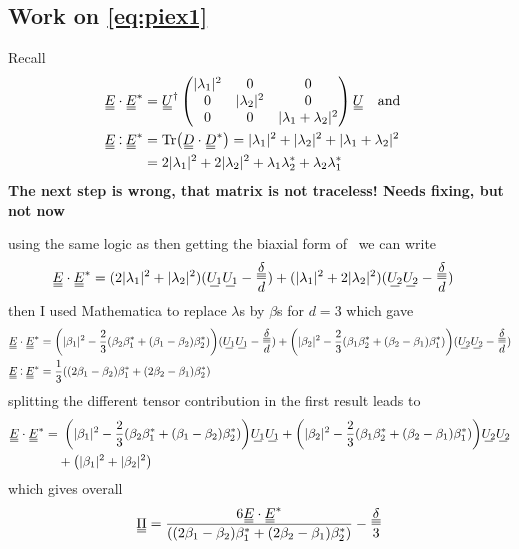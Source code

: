 \documentclass[11pt]{article}
\begin{document}
\subsection{Work on \cref{eq:piex1}}
Recall
\begin{align}
    \du{E} \cdot \du{E}^* &= \du{U}^\dagger \begin{pmatrix} |\lambda_1|^2 & 0 & 0 \\ 0 & |\lambda_2|^2 & 0 \\ 0 & 0 & |\lambda_1 + \lambda_2|^2 \\ \end{pmatrix} \du{U} \qq{and} \\
    \du{E} \cddot \du{E}^* &=  \Tr(\du{D} \cdot \du{D}^*) = |\lambda_1|^2 + |\lambda_2|^2 + |\lambda_1 + \lambda_2|^2 \\
    &= 2|\lambda_1|^2 + 2|\lambda_2|^2 + \lambda_1\lambda_2^* + \lambda_2\lambda_1^*
\end{align}
\textbf{\Large The next step is wrong, that matrix is not traceless! Needs fixing, but not now}

using the same logic as then getting the biaxial form of \EE\ we can write
\begin{align}
    \du{E} \cdot \du{E}^* &= (2|\lambda_1|^2 + |\lambda_2|^2)(\su{U_1}\su{U_1}-\frac{\du{\delta}}{d}) + (|\lambda_1|^2 + 2|\lambda_2|^2)(\su{U_2}\su{U_2}-\frac{\du{\delta}}{d})
\end{align}
then I used Mathematica to replace $\lambda$s by $\beta$s for $d=3$ which gave
\begin{align}
    \du{E} \cdot \du{E}^* &= \qty(|\beta_1|^2 - \frac{2}{3}\qty(\beta_2\beta_1^* + \qty(\beta_1-\beta_2)\beta_2^*))(\su{U_1}\su{U_1}-\frac{\du{\delta}}{d}) + \qty(|\beta_2|^2 - \frac{2}{3}\qty(\beta_1\beta_2^* + \qty(\beta_2-\beta_1)\beta_1^*))(\su{U_2}\su{U_2}-\frac{\du{\delta}}{d}) \\
    \du{E} \cddot \du{E}^* &= \frac{1}{3}\qty((2\beta_1-\beta_2)\beta_1^* + (2\beta_2-\beta_1)\beta_2^*)
\end{align}
splitting the different tensor contribution in the first result leads to
\begin{align}
    \du{E} \cdot \du{E}^* =&\enspace \qty(|\beta_1|^2 - \frac{2}{3}\qty(\beta_2\beta_1^* + \qty(\beta_1-\beta_2)\beta_2^*))\su{U_1}\su{U_1} + \qty(|\beta_2|^2 - \frac{2}{3}\qty(\beta_1\beta_2^* + \qty(\beta_2-\beta_1)\beta_1^*))\su{U_2}\su{U_2} \\
    &+\qty(|\beta_1|^2 + |\beta_2|^2)
\end{align}
which gives overall
\begin{align}
    \du{\Pi} = \frac{6 \du{E} \cdot \du{E}^*}{\qty((2\beta_1-\beta_2)\beta_1^* + (2\beta_2-\beta_1)\beta_2^*)} - \frac{\du{\delta}}{3}
\end{align}
\end{document}
